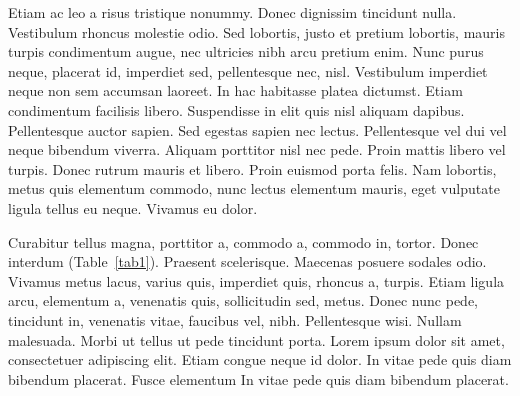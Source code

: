 \documentclass[ASNA,twocolumn]{USG} %
\begin{document}
{Etiam ac leo a risus tristique nonummy. Donec dignissim tincidunt nulla. Vestibulum rhoncus molestie odio. Sed
lobortis, justo et pretium lobortis, mauris turpis condimentum augue, nec ultricies nibh arcu pretium enim. Nunc
purus neque, placerat id, imperdiet sed, pellentesque nec, nisl. Vestibulum imperdiet neque non sem accumsan laoreet.
In hac habitasse platea dictumst. Etiam condimentum facilisis libero. Suspendisse in elit quis nisl aliquam dapibus.
Pellentesque auctor sapien. Sed egestas sapien nec lectus. Pellentesque vel dui vel neque bibendum viverra. Aliquam
porttitor nisl nec pede. Proin mattis libero vel turpis. Donec rutrum mauris et libero. Proin euismod porta felis.
Nam lobortis, metus quis elementum commodo, nunc lectus elementum mauris, eget vulputate ligula tellus eu neque.
Vivamus eu dolor.



Curabitur tellus magna, porttitor a, commodo a, commodo in, tortor. Donec interdum (Table~\ref{tab1}).  Praesent scelerisque. Maecenas posuere sodales odio. Vivamus metus lacus, varius quis, imperdiet quis, rhoncus a, turpis. Etiam ligula arcu,
elementum a, venenatis quis, sollicitudin sed, metus. Donec nunc pede, tincidunt in, venenatis vitae, faucibus vel,
nibh. Pellentesque wisi. Nullam malesuada. Morbi ut tellus ut pede tincidunt porta. Lorem ipsum dolor sit amet,
consectetuer adipiscing elit. Etiam congue neque id dolor. In vitae pede quis diam bibendum placerat. Fusce elementum In vitae pede quis diam bibendum placerat.

}
\end{document}
